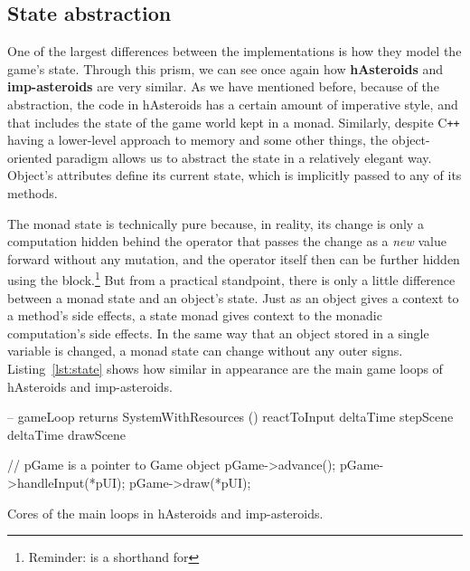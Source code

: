 \documentclass[
  digital, %
  color,   %
  table,   %
  oneside, %
  lof,     %
  lot,     %
]{fithesis3}
\newcommand{\cpp}{C\nolinebreak\texttt{+}\nolinebreak\texttt{+}}
\begin{document}
{\subsection{State abstraction}
\label{sect:stateabstraction}
One of the largest differences between the implementations is how they model the game's state.
Through this prism, we can see once again how \textbf{hAsteroids} and \textbf{imp-asteroids}
are very similar. As we have mentioned before, because of the abstraction,
the code in hAsteroids has a certain amount of imperative style, and that includes the state
of the game world kept in a monad. Similarly, despite \cpp{} having a lower-level
approach to memory and some other things, the object-oriented paradigm allows us
to abstract the state in a relatively elegant way. Object's attributes
define its current state, which is implicitly passed to any of its methods.

The monad state is technically pure because, in reality,
its change is only a computation hidden behind the \inlinehs{>>=} operator
that passes the change as a \emph{new} value forward without any mutation,
and the operator itself then can be further hidden using the  block.\footnote{
Reminder:  is a shorthand for
}
But from a practical standpoint, there is only a little difference between a monad state
and an object's state. Just as an object gives a context to a method's side effects,
a state monad gives context to the monadic computation's side effects.
In the same way that an object stored in a single variable is changed, a monad state
can change without any outer signs. Listing~\ref{lst:state} shows how similar in appearance
are the main game loops of hAsteroids and imp-asteroids.

\begin{listing}[H]
\begin{haskell}
-- gameLoop returns SystemWithResources ()
reactToInput deltaTime
stepScene deltaTime
drawScene
\end{haskell}
\begin{cppblock}
// pGame is a pointer to Game object
pGame->advance();
pGame->handleInput(*pUI);
pGame->draw(*pUI);
\end{cppblock}
\caption{Cores of the main loops in hAsteroids and imp-asteroids.}
\label{lst:state}
\end{listing}

}
\end{document}
